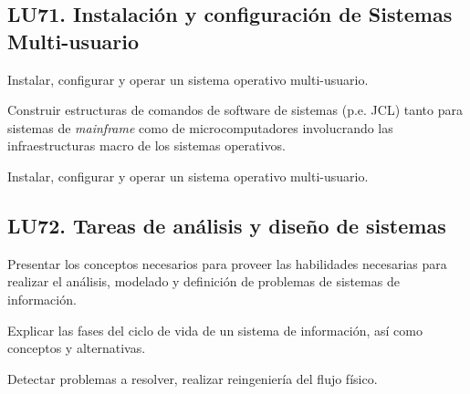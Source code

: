 \subsection{LU71. Instalación y configuración de Sistemas Multi-usuario}\label{sec:LU71}
\begin{LearningUnit}
\begin{LUGoal}
\item Instalar, configurar y operar un sistema operativo multi-usuario.
\end{LUGoal}

\begin{LUObjective}
\item Construir estructuras de comandos de software de sistemas (p.e. JCL) tanto para sistemas de {\it mainframe} como de microcomputadores involucrando las infraestructuras macro de los sistemas operativos.
\item Instalar, configurar y operar un sistema operativo multi-usuario.
\end{LUObjective}
\end{LearningUnit}

\subsection{LU72. Tareas de análisis y diseño de sistemas}\label{sec:LU72}
\begin{LearningUnit}
\begin{LUGoal}
\item Presentar los conceptos necesarios para proveer las habilidades necesarias para realizar el análisis, modelado y definición de problemas de sistemas de información.
\end{LUGoal}

\begin{LUObjective}
\item Explicar las fases del ciclo de vida de un sistema de información, así como conceptos y alternativas.
\item Detectar problemas a resolver, realizar reingeniería del flujo físico.
\end{LUObjective}
\end{LearningUnit}

